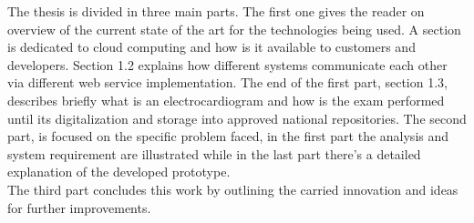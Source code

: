 The thesis is divided in three main parts. The first one gives the reader on overview of the current state of the art for the technologies being used. A section is dedicated to cloud computing and how is it available to customers and developers. Section 1.2 explains how different systems communicate each other via different web service implementation. The end of the first part, section 1.3, describes briefly what is an electrocardiogram and how is the exam performed until its digitalization and storage into approved national repositories. The second part, is focused on the specific problem faced, in the first part the analysis and system requirement are illustrated while in the last part there's a detailed explanation of the developed prototype.\\The third part concludes this work by outlining the carried innovation and ideas for further improvements.